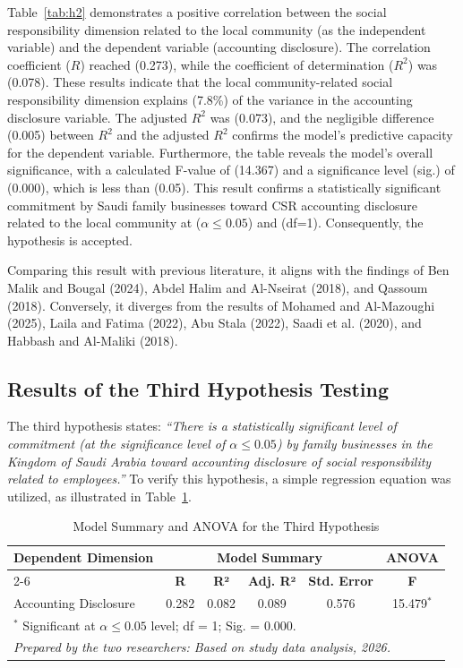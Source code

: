 \documentclass[10pt]{NSP1}
\begin{document}
Table~\ref{tab:h2} demonstrates a positive correlation between the social responsibility dimension related to the local community (as the independent variable) and the dependent variable (accounting disclosure). The correlation coefficient ($R$) reached (0.273), while the coefficient of determination ($R^2$) was (0.078). These results indicate that the local community-related social responsibility dimension explains (7.8\%) of the variance in the accounting disclosure variable. The adjusted $R^2$ was (0.073), and the negligible difference (0.005) between $R^2$ and the adjusted $R^2$ confirms the model's predictive capacity for the dependent variable. Furthermore, the table reveals the model's overall significance, with a calculated F-value of (14.367) and a significance level (sig.) of (0.000), which is less than (0.05). This result confirms a statistically significant commitment by Saudi family businesses toward CSR accounting disclosure related to the local community at ($\alpha \leq 0.05$) and (df=1). Consequently, the hypothesis is accepted.

Comparing this result with previous literature, it aligns with the findings of Ben Malik and Bougal (2024), Abdel Halim and Al-Nseirat (2018), and Qassoum (2018). Conversely, it diverges from the results of Mohamed and Al-Mazoughi (2025), Laila and Fatima (2022), Abu Stala (2022), Saadi et al. (2020), and Habbash and Al-Maliki (2018).

\subsection{Results of the Third Hypothesis Testing}

The third hypothesis states: \emph{``There is a statistically significant level of commitment (at the significance level of $\alpha \leq 0.05$) by family businesses in the Kingdom of Saudi Arabia toward accounting disclosure of social responsibility related to employees.''} To verify this hypothesis, a simple regression equation was utilized, as illustrated in Table~\ref{tab:h3}.

\begin{table}[H]
\centering
\caption{Model Summary and ANOVA for the Third Hypothesis}
\label{tab:h3}
\vspace{5pt}
\small
\begin{tabular}{lccccc}
\hline
\multirow{2}{*}{\textbf{Dependent Dimension}} & \multicolumn{4}{c}{\textbf{Model Summary}} & \multicolumn{1}{c}{\textbf{ANOVA}} \\
\cline{2-6}
 & \textbf{R} & \textbf{R²} & \textbf{Adj. R²} & \textbf{Std. Error} & \textbf{F} \\
\hline
Accounting Disclosure & 0.282 & 0.082 & 0.089 & 0.576 & 15.479$^{*}$ \\
\hline
\multicolumn{6}{l}{\footnotesize $^{*}$ Significant at $\alpha \leq 0.05$ level; df = 1; Sig. = 0.000.} \\
\multicolumn{6}{l}{\footnotesize \textit{Prepared by the two researchers: Based on study data analysis, 2026.}} \\
\end{tabular}
\end{table}
\end{document}
